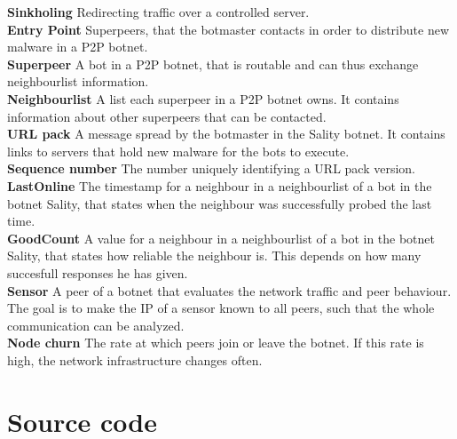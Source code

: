 \documentclass{article}
\begin{document}
\textbf{Sinkholing} Redirecting traffic over a controlled server. \\

\textbf{Entry Point} Superpeers, that the botmaster contacts in order to distribute new malware in a P2P botnet. \\

\textbf{Superpeer} A bot in a P2P botnet, that is routable and can thus exchange neighbourlist information. \\

\textbf{Neighbourlist} A list each superpeer in a P2P botnet owns. It contains information about other superpeers that can be contacted. \\

\textbf{URL pack} A message spread by the botmaster in the Sality botnet. It contains links to servers that hold new malware for the bots to execute. \\

\textbf{Sequence number} The number uniquely identifying a URL pack version. \\

\textbf{LastOnline} The timestamp for a neighbour in a neighbourlist of a bot in the botnet Sality, that states when the neighbour was successfully probed the last time. \\

\textbf{GoodCount} A value for a neighbour in a neighbourlist of a bot in the botnet Sality, that states how reliable the neighbour is. This depends on how many succesfull responses he has given. \\

\textbf{Sensor} A peer of a botnet that evaluates the network traffic and peer behaviour. The goal is to make the IP of a sensor known to all peers, such that the whole communication can be analyzed. \\

\textbf{Node churn} The rate at which peers join or leave the botnet. If this rate is high, the network infrastructure changes often.

\section*{Source code}
\end{document}
